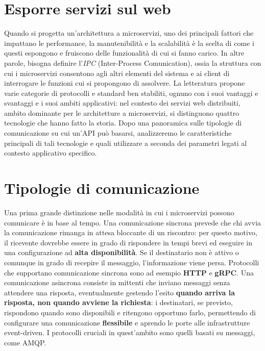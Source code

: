 \section{Esporre servizi sul web}

Quando si progetta un'architettura a microservizi, uno dei principali fattori che impattano le performance, la manutenibilità e la scalabilità è la scelta di come i questi espongono e fruiscono delle funzionalità di cui si fanno carico. In altre parole, bisogna definire l'\emph{IPC} (Inter-Process Comunication), ossia la struttura con cui i microservizi consentono agli altri elementi del sistema e ai client di interrogare le funzioni cui si propongono di assolvere.
La letteratura propone varie categorie di protocolli e standard ben stabiliti, ognuno con i suoi vantaggi e svantaggi e i suoi ambiti applicativi: nel contesto dei servizi web distribuiti, ambito dominante per le architetture a microservizi, si distinguono quattro tecnologie che hanno fatto la storia. Dopo una panoramica sulle tipologie di comunicazione su cui un'API può basarsi, analizzeremo le caratteristiche principali di tali tecnologie e quali utilizzare a seconda dei parametri legati al contesto applicativo specifico.

\section{Tipologie di comunicazione}

Una prima grande distinzione nelle modalità in cui i microservizi possono comunicare è in base al tempo.
Una comunicazione sincrona prevede che chi avvia la comunicazione rimanga in attesa bloccante di un riscontro: per questo motivo, il ricevente dovrebbe essere in grado di rispondere in tempi brevi ed eseguire in una configurazione ad \textbf{alta disponibilità}. Se il destinatario non è attivo o comunque in grado di recepire il messaggio, l'informazione viene persa. Protocolli che supportano comunicazione sincrona sono ad esempio \textbf{HTTP} e \textbf{gRPC}.
Una comunicazione asincrona consiste in mittenti che inviano messaggi senza attendere una risposta, eventualmente gestendo l'esito \textbf{quando arriva la risposta, non quando avviene la richiesta}: i destinatari, se previsto, rispondono quando sono disponibili e ritengono opportuno farlo, permettendo di configurare una comunicazione \textbf{flessibile} e aprendo le porte alle infrastrutture event-driven. I protocolli cruciali in quest'ambito sono quelli basati su messaggi, come AMQP.

